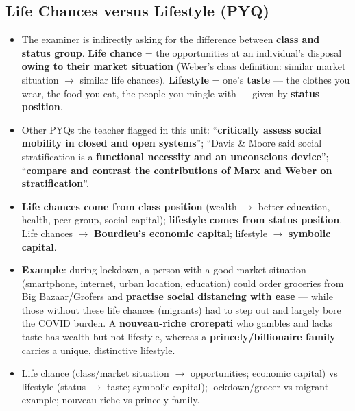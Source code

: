 \sectiondivider

\subsection{Life Chances versus Lifestyle (PYQ)}

\begin{PYQLink}
\begin{itemize}
    \item The examiner is indirectly asking for the difference between \textbf{class and status group}. \textbf{Life chance} = the opportunities at an individual's disposal \textbf{owing to their market situation} (Weber's class definition: similar market situation $\rightarrow$ similar life chances). \textbf{Lifestyle} = one's \textbf{taste} --- the clothes you wear, the food you eat, the people you mingle with --- given by \textbf{status position}.
    \item Other PYQs the teacher flagged in this unit: ``\textbf{critically assess social mobility in closed and open systems}''; ``Davis \& Moore said social stratification is a \textbf{functional necessity and an unconscious device}''; ``\textbf{compare and contrast the contributions of Marx and Weber on stratification}''.
\end{itemize}
\end{PYQLink}

\begin{KeyConcept}
\begin{itemize}
    \item \textbf{Life chances come from class position} (wealth $\rightarrow$ better education, health, peer group, social capital); \textbf{lifestyle comes from status position}. Life chances $\rightarrow$ \textbf{Bourdieu's economic capital}; lifestyle $\rightarrow$ \textbf{symbolic capital}.
    \item \textbf{Example}: during lockdown, a person with a good market situation (smartphone, internet, urban location, education) could order groceries from Big Bazaar/Grofers and \textbf{practise social distancing with ease} --- while those without these life chances (migrants) had to step out and largely bore the COVID burden. A \textbf{nouveau-riche crorepati} who gambles and lacks taste has wealth but not lifestyle, whereas a \textbf{princely/billionaire family} carries a unique, distinctive lifestyle.
\end{itemize}
\end{KeyConcept}

\begin{QuickRevision}
\begin{itemize}
    \item Life chance (class/market situation $\rightarrow$ opportunities; economic capital) vs lifestyle (status $\rightarrow$ taste; symbolic capital); lockdown/grocer vs migrant example; nouveau riche vs princely family.
\end{itemize}
\end{QuickRevision}

